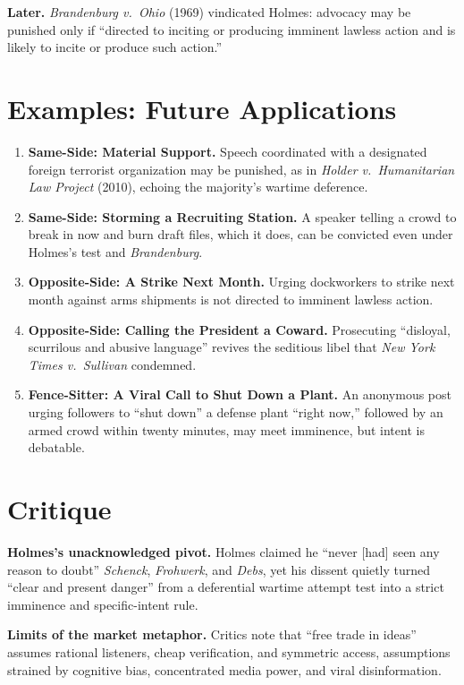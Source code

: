 \documentclass[12pt]{article}
\begin{document}
\textbf{Later.} \textit{Brandenburg v.\ Ohio} (1969) vindicated Holmes: advocacy may be punished only if ``directed to inciting or producing imminent lawless action and is likely to incite or produce such action.''

\section{Examples: Future Applications}

\begin{enumerate}
\item \textbf{Same-Side: Material Support.} Speech coordinated with a designated foreign terrorist organization may be punished, as in \textit{Holder v.\ Humanitarian Law Project} (2010), echoing the majority's wartime deference.
\item \textbf{Same-Side: Storming a Recruiting Station.} A speaker telling a crowd to break in now and burn draft files, which it does, can be convicted even under Holmes's test and \textit{Brandenburg}.
\item \textbf{Opposite-Side: A Strike Next Month.} Urging dockworkers to strike next month against arms shipments is not directed to imminent lawless action.
\item \textbf{Opposite-Side: Calling the President a Coward.} Prosecuting ``disloyal, scurrilous and abusive language'' revives the seditious libel that \textit{New York Times v.\ Sullivan} condemned.
\item \textbf{Fence-Sitter: A Viral Call to Shut Down a Plant.} An anonymous post urging followers to ``shut down'' a defense plant ``right now,'' followed by an armed crowd within twenty minutes, may meet imminence, but intent is debatable.
\end{enumerate}

\section{Critique}

\textbf{Holmes's unacknowledged pivot.} Holmes claimed he ``never [had] seen any reason to doubt'' \textit{Schenck}, \textit{Frohwerk}, and \textit{Debs}, yet his dissent quietly turned ``clear and present danger'' from a deferential wartime attempt test into a strict imminence and specific-intent rule.

\textbf{Limits of the market metaphor.} Critics note that ``free trade in ideas'' assumes rational listeners, cheap verification, and symmetric access, assumptions strained by cognitive bias, concentrated media power, and viral disinformation.
\end{document}
